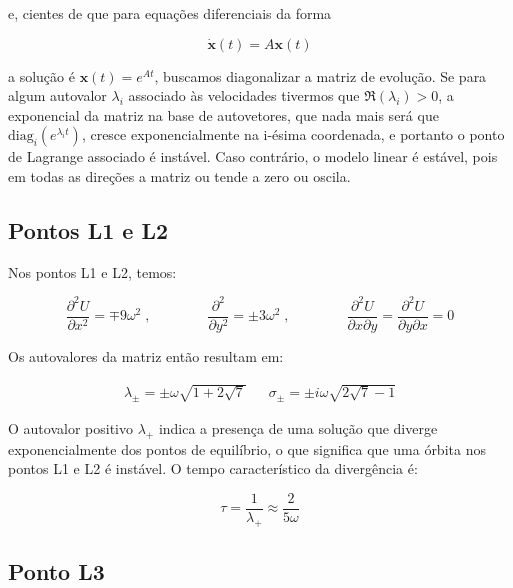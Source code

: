e, cientes de que para equações diferenciais da forma

\begin{equation}
    \dot{\mathbf{x}}(t) = A\mathbf{x}(t)
\end{equation}

a solução é $\mathbf{x}(t) = e^{At}$, buscamos diagonalizar a matriz de evolução. Se para algum autovalor $\lambda_i$ associado às velocidades tivermos que $\Re(\lambda_i) > 0$, a exponencial da matriz na base de autovetores, que nada mais será que $\text{diag}_i(e^{\lambda_i t})$, cresce exponencialmente na i-ésima coordenada, e portanto o ponto de Lagrange associado é instável. Caso contrário, o modelo linear é estável, pois em todas as direções a matriz ou tende a zero ou oscila.

\subsection{Pontos L1 e L2}

Nos pontos L1 e L2, temos:

\begin{equation}
\dfrac{\partial ^2U}{\partial x^2} = \mp 9\omega^2 \;, \qquad \qquad \dfrac{\partial ^2}{\partial y^2} = \pm 3\omega^2 \;, \qquad \qquad \dfrac{\partial ^2U}{\partial x\partial y} = \dfrac{\partial ^2U}{\partial y\partial x} = 0
\end{equation}

\vspace{10px}

Os autovalores da matriz então resultam em:

\vspace{-13px}

\begin{align}
\lambda_{\pm} = \pm \omega \sqrt{1+2\sqrt{7}} && \sigma_{\pm} = \pm i\omega \sqrt{2\sqrt{7}-1}
\end{align}

O autovalor positivo $\lambda_+$ indica a presença de uma solução que diverge exponencialmente dos pontos de equilíbrio, o que significa que uma órbita nos pontos L1 e L2 é instável. O tempo característico da divergência é:

\begin{equation}
\tau = \frac{1}{\lambda_+} \approx \frac{2}{5\omega}
\end{equation}

\subsection{Ponto L3}

